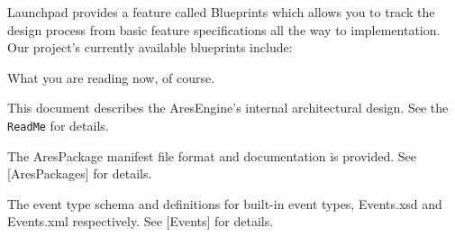 
Launchpad provides a feature called Blueprints which allows you to track the design process from basic feature specifications all the way to implementation. Our project's currently available blueprints include:

\startitemize[4]
\setupwhitespace[big]

What you are reading now, of course.


This document describes the AresEngine's internal architectural design. See the {\tt ReadMe} for details.

\startnarrower[3*left]
\stopnarrower


The AresPackage manifest file format and documentation is provided. See [AresPackages] for details.

\startnarrower[3*left]
\stopnarrower


The event type schema and definitions for built-in event types, Events.xsd and Events.xml respectively. See [Events] for details.
\stopitemize

